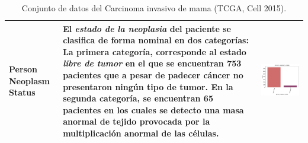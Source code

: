 \begin{table}[!htb]
\begin{threeparttable}
\begin{tabular}{p{2.5cm} p{7cm} p{6.5cm}}
			Person Neoplasm Status
			& El \textit{estado de la neoplasia} del paciente se clasifica de forma nominal en dos categorías: La primera categoría, corresponde al estado \textit{libre de tumor} en el que se encuentran 753 pacientes que a pesar de padecer cáncer no presentaron ningún tipo de tumor. En la segunda categoría, se encuentran 65 pacientes en los cuales se detecto una masa anormal de tejido provocada por la multiplicación anormal de las células.
			& \begin{center}\includegraphics[width=1\linewidth]{NOTEBOOK/IMAGENES_DESCRIPTIVAS/43_person_neoplasm_status}\end{center}
			\\ \hline
		\end{tabular}
			\caption{Conjunto de datos del Carcinoma invasivo de mama (TCGA, Cell 2015).}
			\label{Analisis_Descriptivo}
	\end{threeparttable}
\end{table}
